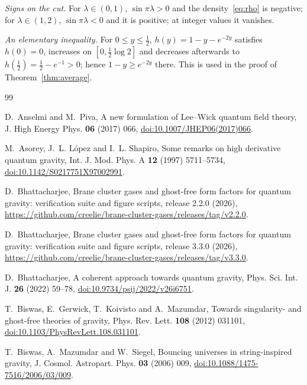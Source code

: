 \documentclass[aps,prd,twocolumn,superscriptaddress,nofootinbib,longbibliography,floatfix,amsmath,amssymb,10pt]{revtex4-2}
\theoremstyle{definition}
\theoremstyle{remark}
\begin{document}
\emph{Signs on the cut.} For $\lambda\in(0,1)$, $\sin\pi\lambda>0$ and the
density~\eqref{eq:rho} is negative; for $\lambda\in(1,2)$, $\sin\pi\lambda<0$
and it is positive; at integer values it vanishes.

\emph{An elementary inequality.} For $0\le y\le\frac12$, $h(y)=1-y-e^{-2y}$
satisfies $h(0)=0$, increases on $[0,\frac12\log2]$ and decreases afterwards
to $h(\frac12)=\frac12-e^{-1}>0$; hence $1-y\ge e^{-2y}$ there. This is used
in the proof of Theorem~\ref{thm:average}.

\begin{thebibliography}{99}\raggedright

D.~Anselmi and M.~Piva, A new formulation of Lee--Wick quantum field theory,
J. High Energy Phys. \textbf{06} (2017) 066,
\href{https://doi.org/10.1007/JHEP06(2017)066}{doi:10.1007/JHEP06(2017)066}.

M.~Asorey, J.~L. L\'opez and I.~L. Shapiro, Some remarks on high derivative
quantum gravity, Int. J. Mod. Phys. A \textbf{12} (1997) 5711--5734,
\href{https://doi.org/10.1142/S0217751X97002991}{doi:10.1142/S0217751X97002991}.

D.~Bhattacharjee, Brane cluster gases and ghost-free form factors for quantum
gravity: verification suite and figure scripts, release 2.2.0 (2026),
\url{https://github.com/creelie/brane-cluster-gases/releases/tag/v2.2.0}.

D.~Bhattacharjee, Brane cluster gases and ghost-free form factors for quantum
gravity: verification suite and figure scripts, release 3.3.0 (2026),
\url{https://github.com/creelie/brane-cluster-gases/releases/tag/v3.3.0}.

D.~Bhattacharjee, A coherent approach towards quantum gravity, Phys. Sci.
Int. J. \textbf{26} (2022) 59--78,
\href{https://doi.org/10.9734/psij/2022/v26i6751}{doi:10.9734/psij/2022/v26i6751}.

T.~Biswas, E.~Gerwick, T.~Koivisto and A.~Mazumdar, Towards singularity- and
ghost-free theories of gravity, Phys. Rev. Lett. \textbf{108} (2012) 031101,
\href{https://doi.org/10.1103/PhysRevLett.108.031101}{doi:10.1103/PhysRevLett.108.031101}.

T.~Biswas, A.~Mazumdar and W.~Siegel, Bouncing universes in string-inspired
gravity, J. Cosmol. Astropart. Phys. \textbf{03} (2006) 009,
\href{https://doi.org/10.1088/1475-7516/2006/03/009}{doi:10.1088/1475-7516/2006/03/009}.


\end{thebibliography}
\end{document}
